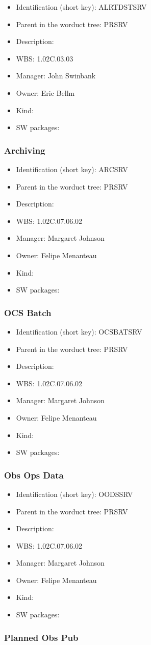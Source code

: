 \begin{itemize}\item Identification (short key): ALRTDSTSRV
\item Parent in the worduct tree: PRSRV
\item Description: 
\item WBS: 1.02C.03.03
\item Manager: John Swinbank
\item Owner: Eric Bellm
\item Kind:
\item SW packages: 
\end{itemize}\subsubsection{Archiving}
\begin{itemize}\item Identification (short key): ARCSRV
\item Parent in the worduct tree: PRSRV
\item Description: 
\item WBS: 1.02C.07.06.02
\item Manager: Margaret Johnson
\item Owner: Felipe Menanteau
\item Kind:
\item SW packages: 
\end{itemize}\subsubsection{OCS Batch}
\begin{itemize}\item Identification (short key): OCSBATSRV
\item Parent in the worduct tree: PRSRV
\item Description: 
\item WBS: 1.02C.07.06.02
\item Manager: Margaret Johnson
\item Owner: Felipe Menanteau
\item Kind:
\item SW packages: 
\end{itemize}\subsubsection{Obs Ops Data}
\begin{itemize}\item Identification (short key): OODSSRV
\item Parent in the worduct tree: PRSRV
\item Description: 
\item WBS: 1.02C.07.06.02
\item Manager: Margaret Johnson
\item Owner: Felipe Menanteau
\item Kind:
\item SW packages: 
\end{itemize}\subsubsection{Planned Obs Pub}
